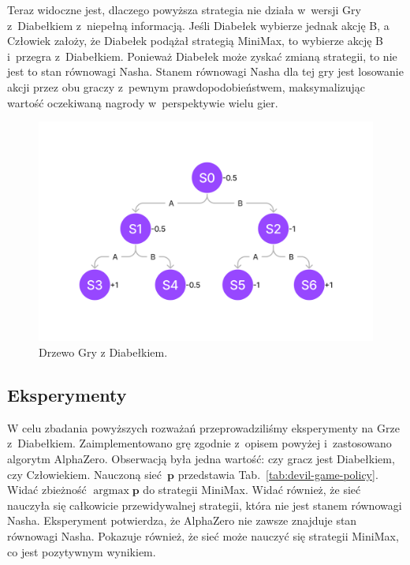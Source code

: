 Teraz widoczne jest, dlaczego powyższa strategia nie działa
w~wersji Gry z~Diabełkiem z~niepełną informacją.
Jeśli Diabełek wybierze jednak akcję B, a Człowiek założy, że Diabełek
podążał strategią MiniMax, to wybierze akcję B i~przegra z~Diabełkiem.
Ponieważ Diabełek może zyskać zmianą strategii, to nie jest to stan równowagi Nasha.
Stanem równowagi Nasha dla tej gry jest losowanie akcji przez obu
graczy z~pewnym prawdopodobieństwem, maksymalizując wartość
oczekiwaną nagrody w~perspektywie wielu gier.

\begin{figure}
    \centering
    \includegraphics[width=\textwidth]{img/ai/devil-game-tree.png}
    \caption{Drzewo Gry z Diabełkiem.}
    \label{fig:devil-game-tree}
\end{figure}

\subsection*{Eksperymenty}

W celu zbadania powyższych rozważań przeprowadziliśmy eksperymenty
na Grze z~Diabełkiem.
Zaimplementowano grę zgodnie z~opisem powyżej
i~zastosowano algorytm AlphaZero.
Obserwacją była jedna wartość: czy gracz jest Diabełkiem, czy Człowiekiem.
Nauczoną sieć~$\mathbf{p}$ przedstawia Tab.~\ref{tab:devil-game-policy}.
Widać zbieżność $\operatorname{argmax} \mathbf{p}$ do strategii MiniMax.
Widać również, że sieć nauczyła się całkowicie przewidywalnej strategii,
która nie jest stanem równowagi Nasha.
Eksperyment potwierdza, że AlphaZero nie zawsze znajduje stan równowagi Nasha.
Pokazuje również, że sieć może nauczyć się strategii MiniMax,
co jest pozytywnym wynikiem.

